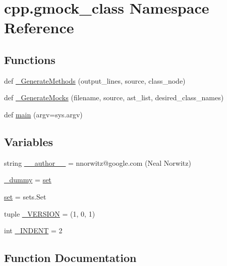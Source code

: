 \hypertarget{namespacecpp_1_1gmock__class}{}\section{cpp.\+gmock\+\_\+class Namespace Reference}
\label{namespacecpp_1_1gmock__class}
\subsection*{Functions}
\begin{DoxyCompactItemize}
\item 
def \mbox{\hyperlink{namespacecpp_1_1gmock__class_ae1b91676e6a4c7ae21c3ef2394a096a1}{\+\_\+\+Generate\+Methods}} (output\+\_\+lines, source, class\+\_\+node)
\item 
def \mbox{\hyperlink{namespacecpp_1_1gmock__class_a3f8d5ceabb0bd6143422efeccc900ca9}{\+\_\+\+Generate\+Mocks}} (filename, source, ast\+\_\+list, desired\+\_\+class\+\_\+names)
\item 
def \mbox{\hyperlink{namespacecpp_1_1gmock__class_a8f99cfdd2b4f0a547d6585b1de78bac0}{main}} (argv=sys.\+argv)
\end{DoxyCompactItemize}
\subsection*{Variables}
\begin{DoxyCompactItemize}
\item 
string \mbox{\hyperlink{namespacecpp_1_1gmock__class_a4a765064f65186f17ff74a9ebb5d27b8}{\+\_\+\+\_\+author\+\_\+\+\_\+}} = \textquotesingle{}nnorwitz@google.\+com (Neal Norwitz)\textquotesingle{}
\item 
\mbox{\hyperlink{namespacecpp_1_1gmock__class_ab4128a969856897356b7956c5ba4fc01}{\+\_\+dummy}} = \mbox{\hyperlink{namespacecpp_1_1gmock__class_a2157e96eee0b4bf9ca6d195ab76f59c2}{set}}
\item 
\mbox{\hyperlink{namespacecpp_1_1gmock__class_a2157e96eee0b4bf9ca6d195ab76f59c2}{set}} = sets.\+Set
\item 
tuple \mbox{\hyperlink{namespacecpp_1_1gmock__class_ae5d7185c5f485142460e91de1394283c}{\+\_\+\+V\+E\+R\+S\+I\+ON}} = (1, 0, 1)
\item 
int \mbox{\hyperlink{namespacecpp_1_1gmock__class_aa09d38d618dd2e76366852c660a832e8}{\+\_\+\+I\+N\+D\+E\+NT}} = 2
\end{DoxyCompactItemize}


\subsection{Function Documentation}
\mbox{\label{namespacecpp_1_1gmock__class_ae1b91676e6a4c7ae21c3ef2394a096a1}} 
